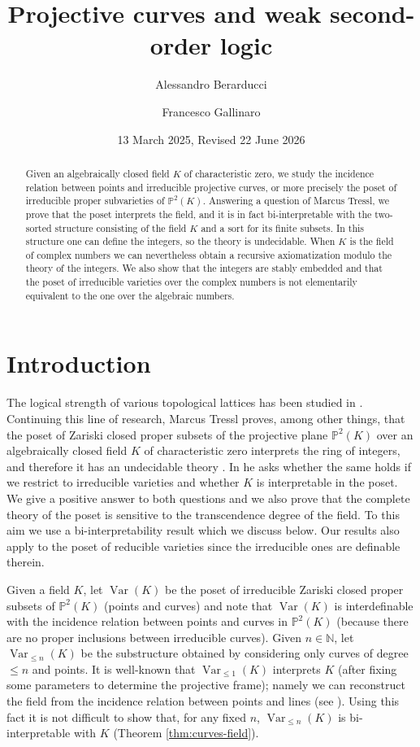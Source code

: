 \documentclass{amsart}
\author{Alessandro Berarducci}
\author{Francesco Gallinaro}
\date{13 March 2025, Revised 22 June 2026}
\title{Projective curves and weak second-order logic}
\newcommand{\N}{\mathbb N}
\theoremstyle{plain}
\theoremstyle{definition}
\newcommand{\Var}[1]{\operatorname{Var}(#1)}
\newcommand{\nVar}[2]{\operatorname{Var}_{#2} (#1)}
\begin{document}
\begin{abstract}Given an algebraically closed field $K$ of characteristic zero, we study the incidence relation between points and irreducible projective curves, or more precisely the poset of irreducible proper subvarieties  of $\mathbb P^2(K)$. Answering a question of Marcus Tressl, we prove that the poset interprets the field, and  it is in fact bi-interpretable with the two-sorted structure consisting of the field $K$ and a sort for its finite subsets. In this structure one can define the integers, so the theory is undecidable. When $K$ is the field of complex numbers we can nevertheless obtain a recursive axiomatization modulo the theory of the integers. We also show that the integers are stably embedded and that the poset of irreducible varieties over the complex numbers is not elementarily equivalent to the one over the algebraic numbers. 
\end{abstract}
\maketitle



\tableofcontents

\section{Introduction}
The logical strength of various topological lattices has been studied in \cite{Gre}. Continuing this line of research, Marcus Tressl proves, among other things, that the poset of Zariski closed proper subsets of the projective plane $\mathbb P^2(K)$ over an algebraically closed field $K$ of characteristic zero interprets the ring of integers, and therefore it has an undecidable theory \cite[7.1]{Tre}. In \cite[Section 8]{Tre} he asks whether the same holds if we restrict to irreducible varieties and whether $K$ is interpretable in the poset. We give a positive answer to both questions and we also prove that the complete theory of the poset is sensitive to the transcendence degree of the field. To this aim we use a bi-interpretability result which we discuss below. Our results also apply to the poset of reducible varieties since the irreducible ones are definable therein.  

Given a field $K$, let $\Var{K}$ be the poset of irreducible Zariski closed proper subsets of $\mathbb P^2(K)$ (points and curves) and note that $\Var{K}$ is interdefinable with the incidence relation between points and curves in $\mathbb P^2(K)$ (because there are no proper inclusions between irreducible curves). Given $n\in \N$, let $\nVar K {\leq n}$ be the substructure obtained by considering only curves of degree $\leq n$ and points. It is well-known that $\nVar K {\leq 1}$ interprets $K$ (after fixing some parameters to determine the projective frame); namely we can reconstruct the field from the incidence relation between points and lines (see \cite{Har,Hilbert}). Using this fact it is not difficult to show that, for any fixed $n$, $\nVar K {\leq n}$ is bi-interpretable with $K$ (Theorem \ref{thm:curves-field}). 
\end{document}
